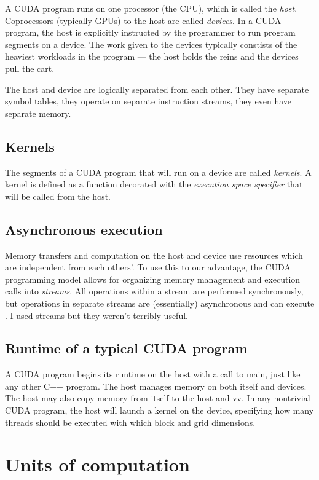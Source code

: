 \documentclass[a4paper,titlepage,12pt]{article}
\begin{document}
\begin{description}[left = \parindent]
A CUDA program runs on one processor (the CPU), which is called the {\em host}.
Coprocessors (typically GPUs) to the host are called {\em devices}.
In a CUDA program, the host is explicitly instructed by the programmer to run program segments on a device.
The work given to the devices typically constists of the heaviest workloads in the program --- the host holds the reins and the devices pull the cart.

The host and device are logically separated from each other.
They have separate symbol tables, they operate on separate instruction streams, they even have separate memory.

\subsection{Kernels}

The segments of a CUDA program that will run on a device are called {\em kernels}.
A kernel is defined as a function decorated with the  {\em execution space specifier} that will be called from the host.

\subsection{Asynchronous execution}
\label{ssec:async}
Memory transfers and computation on the host and device use resources which are independent from each others'.
To use this to our advantage, the CUDA programming model allows for organizing memory management and execution calls into {\em streams}.
All operations within a stream are performed synchronously, but operations in separate streams are (essentially) asynchronous and can execute .
I used streams but they weren't terribly useful.

\subsection{Runtime of a typical CUDA program}
A CUDA program begins its runtime on the host with a call to main, just like any other C++ program.
The host manages memory on both itself and devices.
The host may also copy memory from itself to the host and vv.
In any nontrivial CUDA program, the host will launch a kernel on the device, specifying how many threads should be executed with which block and grid dimensions.%

\newpage
\section{Units of computation}


\end{description}
\end{document}
